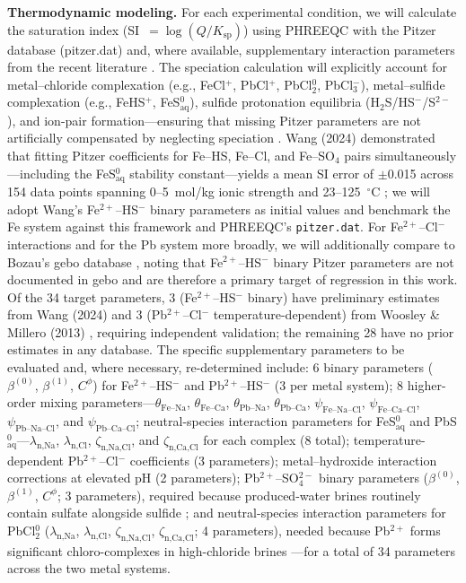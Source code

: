\documentclass[12pt]{article}
\begin{document}
\textbf{Thermodynamic modeling.} For each experimental condition, we will calculate the saturation index (SI~$= \log(Q/K_{\text{sp}})$) using PHREEQC with the Pitzer database (pitzer.dat) and, where available, supplementary interaction parameters from the recent literature \cite{kan2019,wang2020,felmy2000}. The speciation calculation will explicitly account for metal--chloride complexation (e.g., FeCl$^+$, PbCl$^+$, PbCl$_2^0$, PbCl$_3^-$), metal--sulfide complexation (e.g., FeHS$^+$, FeS$^0_{\text{aq}}$), sulfide protonation equilibria (H$_2$S/HS$^-$/S$^{2-}$), and ion-pair formation---ensuring that missing Pitzer parameters are not artificially compensated by neglecting speciation \cite{felmy2000}. Wang (2024) demonstrated that fitting Pitzer coefficients for Fe--HS, Fe--Cl, and Fe--SO$_4$ pairs simultaneously---including the FeS$^0_{\text{aq}}$ stability constant---yields a mean SI error of $\pm$0.015 across 154 data points spanning 0--5~mol/kg ionic strength and 23--125~$^\circ$C \cite{wang2024}; we will adopt Wang's Fe$^{2+}$--HS$^-$ binary parameters as initial values and benchmark the Fe system against this framework and PHREEQC's \texttt{pitzer.dat}. For Fe$^{2+}$--Cl$^-$ interactions and for the Pb system more broadly, we will additionally compare to Bozau's gebo database \cite{bozau2013}, noting that Fe$^{2+}$--HS$^-$ binary Pitzer parameters are not documented in gebo and are therefore a primary target of regression in this work. Of the 34 target parameters, 3 (Fe$^{2+}$--HS$^-$ binary) have preliminary estimates from Wang (2024) and 3 (Pb$^{2+}$--Cl$^-$ temperature-dependent) from Woosley \& Millero (2013) \cite{woosley2013}, requiring independent validation; the remaining 28 have no prior estimates in any database. The specific supplementary parameters to be evaluated and, where necessary, re-determined include: 6 binary parameters ($\beta^{(0)}$, $\beta^{(1)}$, $C^\phi$) for Fe$^{2+}$--HS$^-$ and Pb$^{2+}$--HS$^-$ (3 per metal system); 8 higher-order mixing parameters---$\theta_{\text{Fe--Na}}$, $\theta_{\text{Fe--Ca}}$, $\theta_{\text{Pb--Na}}$, $\theta_{\text{Pb--Ca}}$, $\psi_{\text{Fe--Na--Cl}}$, $\psi_{\text{Fe--Ca--Cl}}$, $\psi_{\text{Pb--Na--Cl}}$, and $\psi_{\text{Pb--Ca--Cl}}$; neutral-species interaction parameters for FeS$^0_{\text{aq}}$ and PbS$^0_{\text{aq}}$---$\lambda_{\text{n,Na}}$, $\lambda_{\text{n,Cl}}$, $\zeta_{\text{n,Na,Cl}}$, and $\zeta_{\text{n,Ca,Cl}}$ for each complex (8 total); temperature-dependent Pb$^{2+}$--Cl$^-$ coefficients (3 parameters); metal--hydroxide interaction corrections at elevated pH (2 parameters); Pb$^{2+}$--SO$_4^{2-}$ binary parameters ($\beta^{(0)}$, $\beta^{(1)}$, $C^\phi$; 3 parameters), required because produced-water brines routinely contain sulfate alongside sulfide \cite{felmy2000,kan2019}; and neutral-species interaction parameters for PbCl$_2^0$ ($\lambda_{\text{n,Na}}$, $\lambda_{\text{n,Cl}}$, $\zeta_{\text{n,Na,Cl}}$, $\zeta_{\text{n,Ca,Cl}}$; 4 parameters), needed because Pb$^{2+}$ forms significant chloro-complexes in high-chloride brines \cite{mgaidi1991}---for a total of 34 parameters across the two metal systems.
\end{document}
